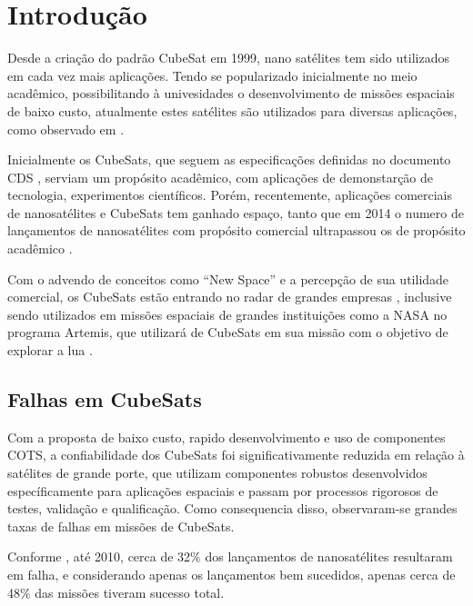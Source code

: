 \chapter{Introdução}\label{cap:intro}

Desde a criação do padrão CubeSat em 1999, nano satélites tem sido utilizados em cada vez mais aplicações. Tendo se popularizado inicialmente no meio acadêmico, possibilitando à univesidades o desenvolvimento de missões espaciais de baixo custo, atualmente estes satélites são utilizados para diversas aplicações, como observado em \textcite{modern-small-sats-economics}.

Inicialmente os CubeSats, que seguem as especificações definidas no documento \gls{CDS} \cite{cds}, serviam um propósito acadêmico, com aplicações de demonstarção de tecnologia, experimentos científicos.
Porém, recentemente, aplicações comerciais de nanosatélites e CubeSats tem ganhado espaço, tanto que em 2014 o numero de lançamentos de nanosatélites com propósito comercial ultrapassou os de propósito acadêmico \cite{modern-small-sats-economics}.

Com o advendo de conceitos como “New Space” e a percepção de sua utilidade comercial, os CubeSats estão entrando no radar de grandes empresas \cite{modern-small-sats-economics}, inclusive sendo utilizados em missões espaciais de grandes instituições como a NASA no programa Artemis, que utilizará de CubeSats em sua missão com o objetivo de explorar a lua \cite{artemis-plan}.

\section{Falhas em CubeSats}\label{sec:intro-falhas}

Com a proposta de baixo custo, rapido desenvolvimento e uso de componentes \gls{COTS}, a confiabilidade dos CubeSats foi significativamente reduzida em relação à satélites de grande porte, que utilizam componentes robustos desenvolvidos específicamente para aplicações espaciais e passam por processos rigorosos de testes, validação e qualificação.
Como consequencia disso, observaram-se grandes taxas de falhas em missões de CubeSats.

Conforme \textcite{survey-nanosat-missions-2010}, até 2010, cerca de 32\% dos lançamentos de nanosatélites resultaram em falha, e considerando apenas os lançamentos bem sucedidos, apenas cerca de 48\% das missões tiveram sucesso total.

